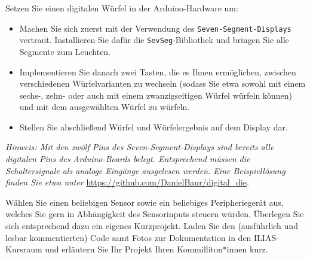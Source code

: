 \documentclass[12pt]{article}
\begin{document}


Setzen Sie einen digitalen Würfel in der Arduino-Hardware um: 
\begin{itemize}
    \item Machen Sie sich zuerst mit der Verwendung des \texttt{Seven-Segment-Displays} vertraut. Installieren Sie dafür die \texttt{SevSeg}-Bibliothek und bringen Sie alle Segmente zum Leuchten.
    \item Implementieren Sie danach zwei Tasten, die es Ihnen ermöglichen, zwischen verschiedenen Würfelvarianten zu wechseln (sodass Sie etwa sowohl mit einem sechs-, zehn- oder auch mit einem zwanzigseitigen Würfel würfeln können) und mit dem ausgewählten Würfel zu würfeln.
    \item Stellen Sie abschließend Würfel und Würfelergebnis auf dem Display dar.
\end{itemize}
\textit{Hinweis: Mit den zwölf Pins des Seven-Segment-Displays sind bereits alle digitalen Pins des Arduino-Boards belegt. Entsprechend müssen die Schaltersignale als analoge Eingänge ausgelesen werden. Eine Beispiellösung finden Sie etwa unter}
\url{https://github.com/DanielBaur/digital_die}.








Wählen Sie einen beliebigen Sensor sowie ein beliebiges Peripheriegerät aus, welches Sie gern in Abhängigkeit des Sensorinputs steuern würden. Überlegen Sie sich entsprechend dazu ein eigenes Kurzprojekt. Laden Sie den (ausführlich und lesbar kommentierten) Code samt Fotos zur Dokumentation in den ILIAS-Kursraum und erläutern Sie Ihr Projekt Ihren Kommilliton*innen kurz.
\end{document}
